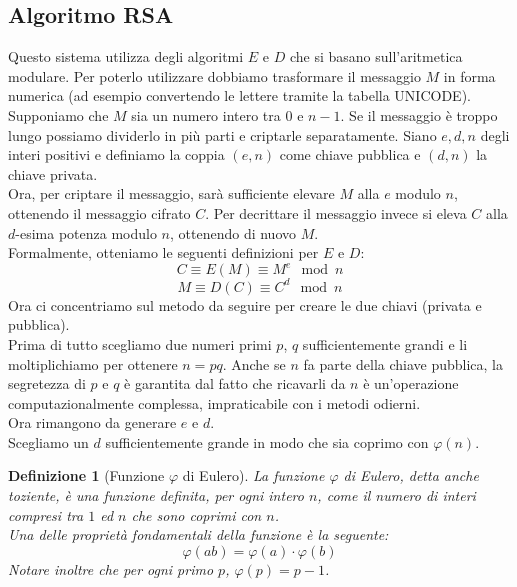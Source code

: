 \documentclass[italian,A4,12pt]{article}
\newtheorem*{defn}{Definizione}
\begin{document}
    \subsection{Algoritmo RSA}
      Questo sistema utilizza degli algoritmi $E$ e $D$ che si basano sull'aritmetica modulare. Per poterlo utilizzare  dobbiamo trasformare il messaggio $M$ in forma numerica (ad esempio convertendo le lettere tramite la tabella UNICODE). Supponiamo che $M$ sia un numero intero tra $0$ e $n-1$. Se il messaggio è troppo lungo possiamo dividerlo in più parti e criptarle separatamente. Siano $e,d,n$ degli interi positivi e definiamo la coppia $(e,n)$ come chiave pubblica e $(d,n)$ la chiave privata.\\
      Ora, per criptare il messaggio, sarà sufficiente elevare $M$ alla $e$ modulo $n$, ottenendo il messaggio cifrato $C$. Per decrittare il messaggio invece si eleva $C$ alla $d$-esima potenza modulo $n$, ottenendo di nuovo $M$. \\Formalmente, otteniamo le seguenti definizioni per $E$ e $D$:
      \begin{equation}
        C\equiv E(M) \equiv M^e \mod{n}
     \end{equation}
      $$M \equiv D(C) \equiv C^d \mod{n}$$
      Ora ci concentriamo sul metodo da seguire per creare le due chiavi (privata e pubblica). \\Prima di tutto scegliamo due numeri primi $p$, $q$ sufficientemente grandi e li moltiplichiamo per ottenere $n=pq$. Anche se $n$ fa parte della chiave pubblica, la segretezza di $p$ e $q$ è garantita dal fatto che ricavarli da $n$ è un'operazione computazionalmente complessa, impraticabile con i metodi odierni.\\
      Ora rimangono da generare $e$ e $d$.\\ Scegliamo un $d$ sufficientemente grande in modo che sia coprimo con $\varphi(n)$.
      \begin{defn}[Funzione $\varphi$ di Eulero]
        La funzione $\varphi$ di Eulero, detta anche toziente, è una funzione definita, per ogni intero $n$, come il numero di interi compresi tra $1$ ed $n$ che sono coprimi con $n$.\\ Una delle proprietà fondamentali della funzione è la seguente:
        \begin{equation}
          \varphi(ab)=\varphi(a)\cdot \varphi(b) \label{phii}
        \end{equation}
        Notare inoltre che per ogni primo $p$, $\varphi(p)=p-1$.
      \end{defn}
\end{document}
